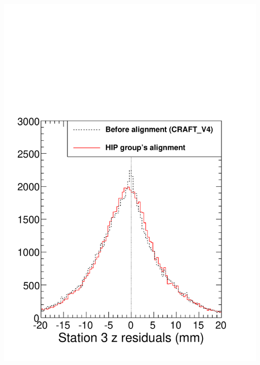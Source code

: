 \documentclass[compress]{beamer}
\begin{document}
\begin{frame}
\begin{columns}
\includegraphics[width=\linewidth]{rawz_station3.pdf}


\end{columns}
\end{frame}
\end{document}
